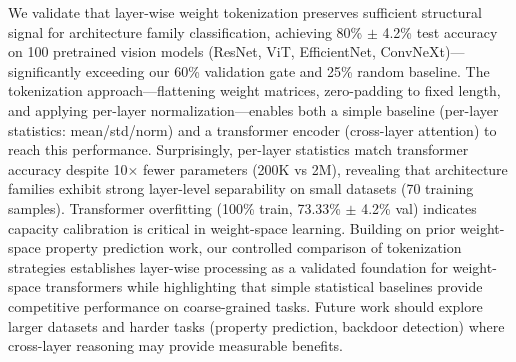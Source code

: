 We validate that layer-wise weight tokenization preserves sufficient structural signal for architecture family classification, achieving 80\% $\pm$ 4.2\% test accuracy on 100 pretrained vision models (ResNet, ViT, EfficientNet, ConvNeXt)—significantly exceeding our 60\% validation gate and 25\% random baseline. The tokenization approach—flattening weight matrices, zero-padding to fixed length, and applying per-layer normalization—enables both a simple baseline (per-layer statistics: mean/std/norm) and a transformer encoder (cross-layer attention) to reach this performance. Surprisingly, per-layer statistics match transformer accuracy despite 10$\times$ fewer parameters (200K vs 2M), revealing that architecture families exhibit strong layer-level separability on small datasets (70 training samples). Transformer overfitting (100\% train, 73.33\% $\pm$ 4.2\% val) indicates capacity calibration is critical in weight-space learning. Building on prior weight-space property prediction work, our controlled comparison of tokenization strategies establishes layer-wise processing as a validated foundation for weight-space transformers while highlighting that simple statistical baselines provide competitive performance on coarse-grained tasks. Future work should explore larger datasets and harder tasks (property prediction, backdoor detection) where cross-layer reasoning may provide measurable benefits.
